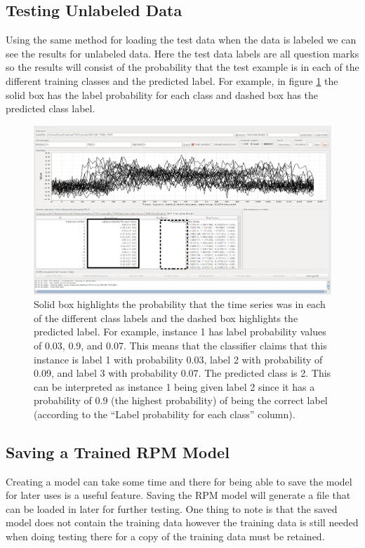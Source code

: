 \documentclass[titlepage, letterpaper, 12pt]{article}
\begin{document}
\subsection{Testing Unlabeled Data}
Using the same method for loading the test data when the data is labeled we can see the results for unlabeled data.  Here the test data labels are all question marks so the results will consist of the probability that the test example is in each of the different training classes and the predicted label.  For example, in figure \ref{fig:TSAT-Results-Unknown-Test} the solid box has the label probability for each class and dashed box has the predicted class label.
\begin{figure}[H]
	\includegraphics[width=\textwidth]{RPMTimeSeriesResultsUnknown}
	\caption{Solid box highlights the probability that the time series was in each of the different class labels and the dashed box highlights the predicted label.  For example, instance 1 has label probability values of 0.03, 0.9, and 0.07.  This means that the classifier claims that this instance is label 1 with probability 0.03, label 2 with probability of 0.09, and label 3 with probability 0.07. The predicted class is 2.  This can be interpreted as instance 1 being given label 2 since it has a probability of 0.9 (the highest probability) of being the correct label (according to the ``Label probability for each class'' column).  }
	\label{fig:TSAT-Results-Unknown-Test}
\end{figure}

\subsection{Saving a Trained RPM Model}
\label{RPMSaving}
Creating a model can take some time and there for being able to save the model for later uses is a useful feature. Saving the RPM model will generate a file that can be loaded in later for further testing. One thing to note is that the saved model does not contain the training data however the training data is still needed when doing testing there for a copy of the training data must be retained.
\newpage
\end{document}
